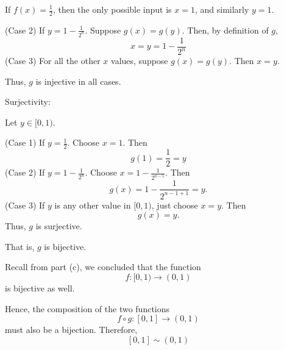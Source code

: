 \documentclass[12pt]{article}
\begin{document}
\begin{enumerate}
            If $f(x)=\frac12$, then the only possible input is $x=1$,
            and similarly $y=1$.

            (Case 2) If $y = 1 - \frac{1}{2^n}$. Suppose $g(x) = g(y)$.
            Then, by definition of $g$,
            \[
                  x = y = 1 - \frac{1}{2^n}
            \]
            (Case 3) For all the other $x$ values, suppose $g(x) = g(y)$.
            Then $x = y$.

            Thus, $g$ is injective in all cases.

            Surjectivity:

            Let $y \in [0,1)$.

            (Case 1) If $y = \frac{1}{2}$. Choose $x = 1$.
            Then
            \[
                  g(1) = \frac{1}{2} = y
            \]
            (Case 2) If $y = 1 - \frac{1}{2^n}$. Choose $x = 1 - \frac{1}{2^{n-1}}$.
            Then
            \[
                  g(x) = 1 - \frac{1}{2^{n -1 + 1}} = y.
            \]
            (Case 3) If $y$ is any other value in $[0,1)$, just choose $x = y$.
            Then
            \[
                  g(x) = y.
            \]
            Thus, $g$ is surjective.

            That is, $g$ is bijective.

            Recall from part (c), we concluded that the function
            \[
                  f: [0, 1) \to (0,1)
            \]
            is bijective as well.

            Hence, the composition of the two functions
            \[
                  f \circ g: [0, 1] \to (0, 1)
            \]
            must also be a bijection.
            Therefore,
            \[
                  [0, 1] \sim (0, 1)
            \]
\end{enumerate}
\end{document}
